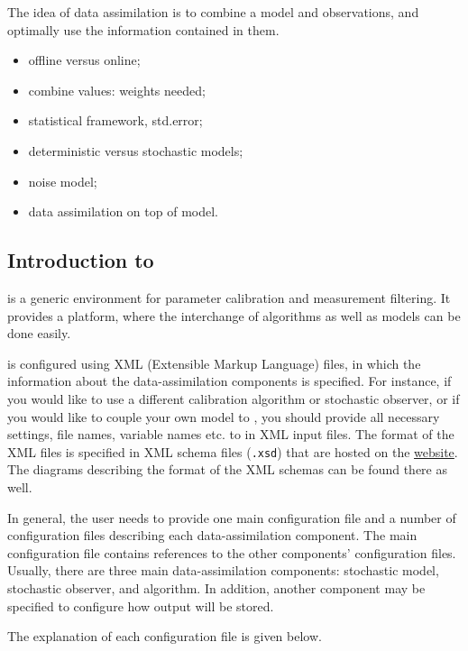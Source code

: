 The idea of data assimilation is to combine a model and observations, and optimally use the information contained in them.

\begin{itemize}
    \item offline versus online;
    \item combine values: weights needed;
    \item statistical framework, std.error;
    \item deterministic versus stochastic models;
    \item noise model;
    \item data assimilation on top of model.
\end{itemize}

\subsection{Introduction to \oda}
\oda is a generic environment for parameter calibration and measurement filtering. It provides a platform, where the interchange of algorithms as well as models can be done easily.

\oda is configured using XML (Extensible Markup Language) files, in which the information about the data-assimilation components is specified. For instance, if you would like to use a different calibration algorithm or stochastic observer, or if you would like to couple your own model to \oda, you should provide all necessary settings, file names, variable names etc. to \oda in XML input files. The format of the XML files is specified in XML schema files (\verb|.xsd|) that are hosted on the \href{http://openda.org/docu/openda_2.4/doc/xmlSchemasHTML/index.html}{\oda website}. The diagrams describing the format of the XML schemas can be found there as well. 

In general, the user needs to provide one main configuration file and a number of configuration files describing each data-assimilation component. The main configuration file contains references to the other components’ configuration files. Usually, there are three main data-assimilation components: stochastic model, stochastic observer, and algorithm. In addition, another component may be specified to configure how \oda output will be stored. 

The explanation of each configuration file is given below.

